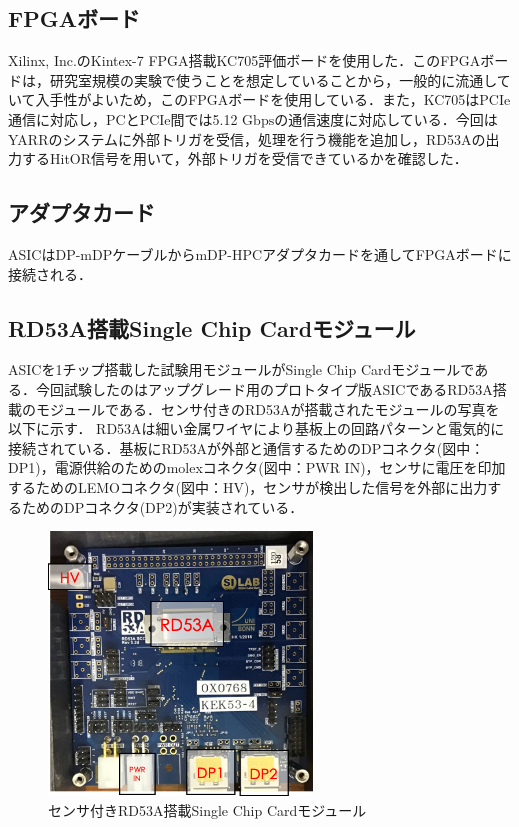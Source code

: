 \subsection*{FPGAボード}
Xilinx, Inc.のKintex-7 FPGA搭載KC705評価ボードを使用した．このFPGAボードは，研究室規模の実験で使うことを想定していることから，一般的に流通していて入手性がよいため，このFPGAボードを使用している．また，KC705はPCIe通信に対応し，PCとPCIe間では5.12 $\mathrm{Gbps}$の通信速度に対応している．今回はYARRのシステムに外部トリガを受信，処理を行う機能を追加し，RD53Aの出力するHitOR信号を用いて，外部トリガを受信できているかを確認した．

\subsection*{アダプタカード}
ASICはDP-mDPケーブルからmDP-HPCアダプタカードを通してFPGAボードに接続される．

\subsection*{RD53A搭載Single Chip Cardモジュール}
ASICを1チップ搭載した試験用モジュールがSingle Chip Cardモジュールである．今回試験したのはアップグレード用のプロトタイプ版ASICであるRD53A搭載のモジュールである．センサ付きのRD53Aが搭載されたモジュールの写真を以下に示す．
RD53Aは細い金属ワイヤにより基板上の回路パターンと電気的に接続されている．基板にRD53Aが外部と通信するためのDPコネクタ(図中：DP1)，電源供給のためのmolexコネクタ(図中：PWR IN)，センサに電圧を印加するためのLEMOコネクタ(図中：HV)，センサが検出した信号を外部に出力するためのDPコネクタ(DP2)が実装されている．
\begin{figure}[h]
  \centering
  \includegraphics[width=7cm]{./figure/rd53a.png}
  \caption{センサ付きRD53A搭載Single Chip Cardモジュール}
  \label{fig:scurve}
\end{figure}

